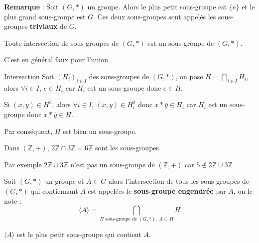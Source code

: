\textbf{Remarque} : Soit $(G, *)$ un groupe. Alors le plus petit sous-groupe est $\{e\}$ et le plus grand sous-groupe est $G$. Ces deux sous-groupes sont appelés les sous-groupes \textbf{triviaux} de $G$.


\begin{Prop}{}{}
Toute intersection de sous-groupes de $(G, *)$ est un sous-groupe de $(G, *)$. 

C'est en général faux pour l'union. 
\end{Prop}

\begin{myproof}{Intersection}{}
Soit $(H_i) _{i \in I}$ des sous-groupes de $(G, *)$, on pose $H = \bigcap _{i \in I} H _i$, alors $\forall i \in I$, $e \in H_i$ car $H_i$ est un sous-groupe donc $e\in H$.

Si $(x,y) \in H ^{2}$, alors $\forall i \in I$, $(x,y) \in H_i ^{2}$ donc $x * \bar{y} \in H_i$ car $H_i$ est un sous-groupe donc $x * \bar{y} \in H$. 

Par conséquent, $H$ est bien un sous-groupe.
\end{myproof}

\begin{Example}{}{}
Dans $(\mathbb{Z},+)$, $2 \mathbb{Z} \cap 3 \mathbb{Z} = 6 \mathbb{Z}$ sont les sous-groupes.

Par exemple $2 \mathbb{Z} \cup 3 \mathbb{Z}$ n'est pas un sous-groupe de $(\mathbb{Z}, +)$ car $5 \not \in 2 \mathbb{Z} \cup 3 \mathbb{Z}$
\end{Example}

\begin{Definition}[colbacktitle=red!75!black]{}{}
Soit $(G, *)$ un groupe et $A \subset G$ alors l'intersection de tous les sous-groupes de $(G, *)$ qui contiennant $A$ est appelées le \textbf{sous-groupe engendrée} par $A$, on le note : 
\begin{equation}
  \langle A \rangle = \bigcap _{H \text{ sous-groupe de }(G,*), \; A \subset H} H
\end{equation}
\end{Definition}

\begin{Prop}{}{}
$\langle A \rangle$ est le plus petit sous-groupe qui contient $A$. 
\end{Prop}

